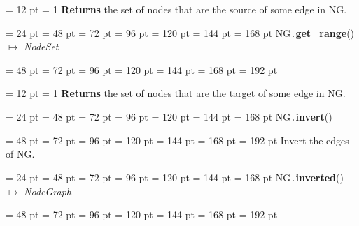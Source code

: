 {{{{{{\par \pagebreak[3.100000] \noindent \hangindent = 12 pt \hangafter = 1 
{\bf Returns \/} the set of nodes that are the source of some edge in NG.
\par}
\par}
\par}
\par}
\par}
{\par \noindent  \leftskip = 24 pt  \leftmargini = 48 pt  \leftmarginii = 72 pt  \leftmarginiii = 96 pt  \leftmarginiv = 120 pt  \leftmarginv = 144 pt  \leftmarginvi = 168 pt NG{\tt .\/}{\bf {\large {\bf get{\_}range\/}}\/}() \(\mapsto \)  {\em NodeSet\/}{\par \noindent
{\par \noindent  \leftskip = 48 pt  \leftmargini = 72 pt  \leftmarginii = 96 pt  \leftmarginiii = 120 pt  \leftmarginiv = 144 pt  \leftmarginv = 168 pt  \leftmarginvi = 192 pt {\par \noindent
{\par \pagebreak[3.100000] \noindent \hangindent = 12 pt \hangafter = 1 
{\bf Returns \/} the set of nodes that are the target of some edge in NG.
\par}
\par}
\par}
\par}
\par}
{\par \noindent  \leftskip = 24 pt  \leftmargini = 48 pt  \leftmarginii = 72 pt  \leftmarginiii = 96 pt  \leftmarginiv = 120 pt  \leftmarginv = 144 pt  \leftmarginvi = 168 pt NG{\tt .\/}{\bf {\large {\bf invert\/}}\/}(){\par \noindent
{\par \noindent  \leftskip = 48 pt  \leftmargini = 72 pt  \leftmarginii = 96 pt  \leftmarginiii = 120 pt  \leftmarginiv = 144 pt  \leftmarginv = 168 pt  \leftmarginvi = 192 pt  Invert the edges of NG.
\par}
\par}
\par}
{\par \noindent  \leftskip = 24 pt  \leftmargini = 48 pt  \leftmarginii = 72 pt  \leftmarginiii = 96 pt  \leftmarginiv = 120 pt  \leftmarginv = 144 pt  \leftmarginvi = 168 pt NG{\tt .\/}{\bf {\large {\bf inverted\/}}\/}() \(\mapsto \)  {\em NodeGraph\/}{\par \noindent
{\par \noindent  \leftskip = 48 pt  \leftmargini = 72 pt  \leftmarginii = 96 pt  \leftmarginiii = 120 pt  \leftmarginiv = 144 pt  \leftmarginv = 168 pt  \leftmarginvi = 192 pt {\par \noindent
}}}}}

